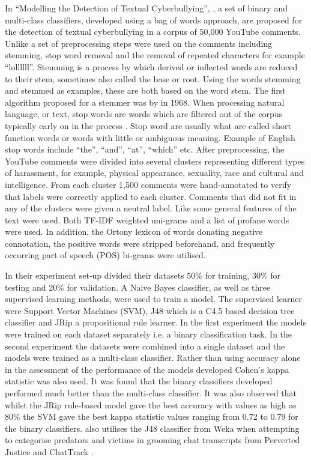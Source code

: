 In ``Modelling the Detection of Textual Cyberbullying'', \citet{dinakar_modeling_2011}, a set of binary and multi-class classifiers, developed using a bag of words approach, are proposed for the detection of textual cyberbullying in a corpus of 50,000 YouTube comments. Unlike \citet{yin_detection_2009} a set of preprocessing steps were used on the comments including stemming, stop word removal and the removal of repeated characters for example ``lollllll''. Stemming is a process by which  derived or inflected  words are reduced to their stem, sometimes also called the base or root. Using the words stemming and stemmed as examples, these are both based on the word stem. The first algorithm proposed for a stemmer was by \citet{lovins_development_1968} in 1968. When processing natural language, or text, stop words are words which are filtered out of the corpus typically early on in the process \cite{rajaraman_mining_2011}. Stop word are usually what are called short function words or words with little or ambiguous meaning. Example of English stop words include ``the'', ``and'', ``at'', ``which'' etc.  After preprocessing, the YouTube comments were divided into several clusters representing different types of harassment, for example, physical appearance, sexuality, race and cultural and intelligence. From each cluster 1,500 comments were hand-annotated to verify that labels were correctly applied to each cluster. Comments that did not fit in any of the clusters were given a neutral label. Like \citet{yin_detection_2009} some general features of the text were used. Both TF-IDF weighted uni-grams and a list of profane words were used. In addition, the Ortony lexicon \cite{ortony_referential_1987} of words donating negative connotation, the positive words were stripped beforehand, and frequently occurring part of speech (POS) bi-grams were utilised. 

In their experiment set-up \citet{dinakar_modeling_2011} divided their datasets 50\% for training, 30\% for testing and 20\% for validation. A Naive Bayes classifier, as well as three supervised learning methods, were used to train a model. The supervised learner were Support Vector Machines (SVM), J48 which is a C4.5 based decision tree classifier and JRip a propositional rule learner. In the first experiment the models were trained on each dataset separately i.e. a binary classification task. In the second experiment the datasets were combined into a single dataset and the models were trained as a multi-class classifier. Rather than using accuracy alone in the assessment of the performance of the models developed Cohen's kappa statistic was also used. It was found that the binary classifiers developed performed much better than the multi-class classifier. It was also observed that whilst the JRip rule-based model gave the best accuracy with values as high as 80\% the SVM gave the best kappa statistic values ranging from 0.72 to 0.79 for the binary classifiers. \citet{kontostathis_chatcoder:_2009} also utilises the J48 classifier from Weka \cite{hall_weka_2009} when attempting to categorise predators and victims in grooming chat transcripts from Perverted Justice \cite{_perverted-justice.com_????} and ChatTrack \cite{bengel_chattrack:_2004}.

